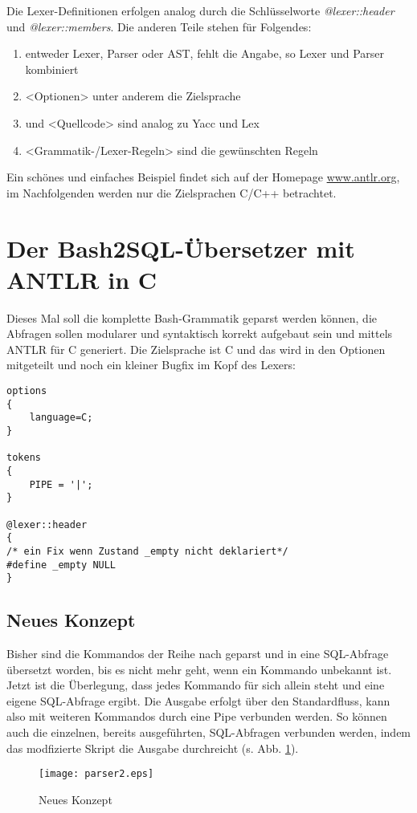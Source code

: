Die Lexer-Definitionen erfolgen analog durch die Schlüsselworte \textit{@lexer::header} und \textit{@lexer::members}. Die anderen Teile stehen für Folgendes:
\begin{enumerate}
\item <Grammatik-Typ> entweder Lexer, Parser oder AST, fehlt die Angabe, so Lexer und Parser kombiniert
\item <Optionen> unter anderem die Zielsprache
\item <Token-Definition> und <Quellcode> sind analog zu Yacc und Lex
\item <Grammatik-/Lexer-Regeln> sind die gewünschten Regeln
\end{enumerate}
Ein schönes und einfaches Beispiel findet sich auf der Homepage \url{www.antlr.org}, im Nachfolgenden werden nur die Zielsprachen C/C++ betrachtet.

\section{Der Bash2SQL-Übersetzer mit ANTLR in C}
Dieses Mal soll die komplette Bash-Grammatik geparst werden können, die Abfragen sollen modularer und syntaktisch korrekt aufgebaut sein und mittels ANTLR für C generiert. Die Zielsprache ist C und das wird in den Optionen mitgeteilt und noch ein kleiner Bugfix im Kopf des Lexers:

\begin{lstlisting}
options
{
    language=C;
}

tokens
{
    PIPE = '|';
}

@lexer::header
{
/* ein Fix wenn Zustand _empty nicht deklariert*/
#define _empty NULL
}
\end{lstlisting}

\subsection{Neues Konzept}
Bisher sind die Kommandos der Reihe nach geparst und in eine SQL-Abfrage übersetzt worden, bis es nicht mehr geht, wenn ein Kommando unbekannt ist. Jetzt ist die Überlegung, dass jedes Kommando für sich allein steht und eine eigene SQL-Abfrage ergibt. Die Ausgabe erfolgt über den Standardfluss, kann also mit weiteren Kommandos durch eine Pipe verbunden werden. So können auch die einzelnen, bereits ausgeführten, SQL-Abfragen verbunden werden, indem das modfizierte Skript die Ausgabe durchreicht (s. Abb. \ref{fig:parser2}).

\begin{figure}[h]
\centering
\texttt{[image: parser2.eps]}
\caption{Neues Konzept}
\label{fig:parser2}
\end{figure}

